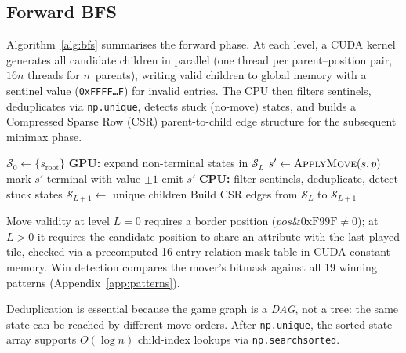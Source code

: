 \documentclass[11pt,a4paper]{article}
\begin{document}
\subsection{Forward BFS}\label{sec:bfs}

Algorithm~\ref{alg:bfs} summarises the forward phase.  At each level, a CUDA
kernel generates all candidate children in parallel (one thread per
parent--position pair, $16n$ threads for $n$~parents), writing valid children
to global memory with a sentinel value (\texttt{0xFFFF\dots F}) for invalid
entries.  The CPU then filters sentinels, deduplicates via
\texttt{np.unique}, detects stuck (no-move) states, and builds a Compressed
Sparse Row (CSR) parent-to-child edge structure for the subsequent minimax
phase.

\begin{algorithm}[t]
\caption{Forward BFS (state enumeration)}\label{alg:bfs}
\begin{algorithmic}[1]
\State $\mathcal{S}_0 \gets \{s_{\text{root}}\}$
 
  \State \textbf{GPU:} expand non-terminal states in $\mathcal{S}_L$
      \State $s' \gets \textsc{ApplyMove}(s, p)$
       mark $s'$ terminal with value $\pm 1$
      \EndIf
      \State emit $s'$
    \EndIf
  \EndFor
  \State \textbf{CPU:} filter sentinels, deduplicate, detect stuck states
  \State $\mathcal{S}_{L+1} \gets$ unique children
  \State Build CSR edges from $\mathcal{S}_L$ to $\mathcal{S}_{L+1}$
\EndFor
\end{algorithmic}
\end{algorithm}

Move validity at level $L{=}0$ requires a border position ($\mathit{pos}
\mathbin{\&} \text{0xF99F} \neq 0$); at $L{>}0$ it requires the candidate
position to share an attribute with the last-played tile, checked via a
precomputed 16-entry relation-mask table in CUDA constant memory.  Win
detection compares the mover's bitmask against all 19 winning patterns
(Appendix~\ref{app:patterns}).

Deduplication is essential because the game graph is a \emph{DAG}, not a
tree: the same state can be reached by different move orders.  After
\texttt{np.unique}, the sorted state array supports $O(\log n)$ child-index
lookups via \texttt{np.searchsorted}.
\end{document}
